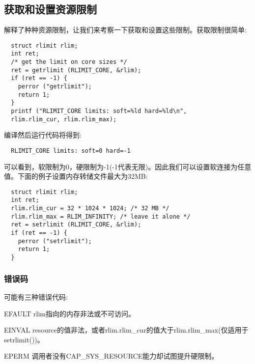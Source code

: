 \subsection{获取和设置资源限制}

  解释了种种资源限制，让我们来考察一下获取和设置这些限制。获取限制很简单:

\begin{lstlisting}
  struct rlimit rlim;
  int ret;
  /* get the limit on core sizes */
  ret = getrlimit (RLIMIT_CORE, &rlim);
  if (ret == -1) {
    perror ("getrlimit");
    return 1;
  }
  printf ("RLIMIT_CORE limits: soft=%ld hard=%ld\n",
  rlim.rlim_cur, rlim.rlim_max);
\end{lstlisting}

  编译然后运行代码将得到:

\begin{verbatim}
  RLIMIT_CORE limits: soft=0 hard=-1
\end{verbatim}

  可以看到，软限制为0，硬限制为-1(-1代表无限)。因此我们可以设置软连接为任意值。下面的例子设置内存转储文件最大为32MB:
\begin{lstlisting}
  struct rlimit rlim;
  int ret;
  rlim.rlim_cur = 32 * 1024 * 1024; /* 32 MB */
  rlim.rlim_max = RLIM_INFINITY; /* leave it alone */
  ret = setrlimit (RLIMIT_CORE, &rlim);
  if (ret == -1) {
    perror ("setrlimit");
    return 1;
  }
\end{lstlisting}

\subsubsection{错误码}

  可能有三种错误代码:

\begin{eqlist*}
\item[EFAULT] rlim指向的内存非法或不可访问。
\item[EINVAL] resource的值非法，或者rlim.rlim\_cur的值大于rlim.rlim\_max(仅适用于setrlimit())。
\item[EPERM] 调用者没有CAP\_SYS\_RESOURCE能力却试图提升硬限制。
\end{eqlist*}
